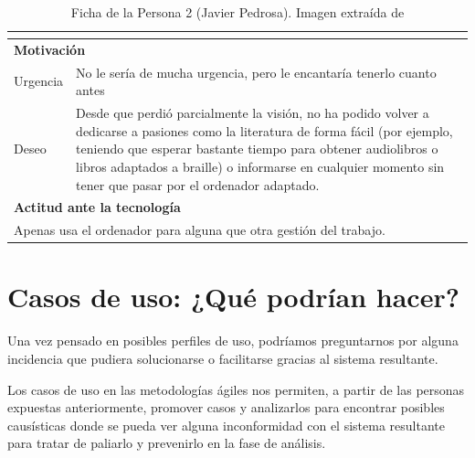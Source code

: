 \begin{table}[H]
\begin{tabular}{|l|l|l|}
{		}                \\ 
		\hline
		\multicolumn{3}{|l|}{{\cellcolor{lightblue}}\textbf{Motivación}}                   \\ 
		\hline
		Urgencia     & \multicolumn{2}{l|}{
			\begin{minipage}[t]{0.7\textwidth}
				No le sería de mucha urgencia, pero le encantaría tenerlo cuanto antes
			\end{minipage}
		}                \\ 
		\hline
		Deseo        & \multicolumn{2}{l|}{
			\begin{minipage}[t]{0.7\textwidth}
				Desde que perdió parcialmente la visión, no ha podido volver a dedicarse a pasiones como la literatura de forma fácil (por ejemplo, teniendo que esperar bastante tiempo para obtener audiolibros o libros adaptados a braille) o informarse en cualquier momento sin tener que pasar por el ordenador adaptado.
			\end{minipage}
		}                \\ 
		\hline
		\multicolumn{3}{|l|}{{\cellcolor{lightblue}}\textbf{Actitud ante la tecnología}}    \\ 
		\hline
		\multicolumn{3}{|l|}{
			\begin{minipage}[t]{\textwidth}
				Apenas usa el ordenador para alguna que otra gestión del trabajo.
			\end{minipage}
		}                              \\
		\hline
	\end{tabular}
	\caption[Ficha Persona 2]{Ficha de la Persona 2 (Javier Pedrosa). Imagen extraída de \cite{thispersondoesnotexist}}
\end{table}

\newpage

\section{Casos de uso: ¿Qué podrían hacer?}
\label{casos-uso}

Una vez pensado en posibles perfiles de uso, podríamos preguntarnos por alguna incidencia que pudiera solucionarse o facilitarse gracias al sistema resultante.

Los casos de uso en las metodologías ágiles nos permiten, a partir de las personas expuestas anteriormente, promover casos y analizarlos para encontrar posibles causísticas donde se pueda ver alguna inconformidad con el sistema resultante para tratar de paliarlo y prevenirlo en la fase de análisis.

